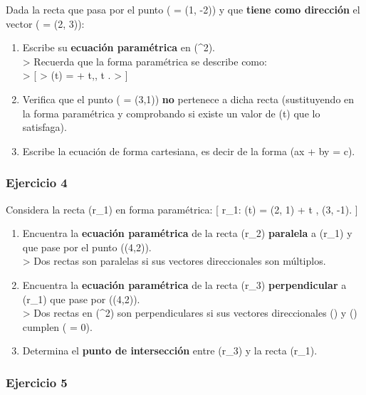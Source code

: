 \documentclass[
  letterpaper,
  DIV=11,
  numbers=noendperiod]{scrartcl}
\begin{document}
Dada la recta que pasa por el punto ( = (1, -2)) y que
\textbf{tiene como dirección} el vector ( = (2, 3)):

\begin{enumerate}
\def\labelenumi{\arabic{enumi}.}
\item
  Escribe su \textbf{ecuación paramétrica} en (\^{}2).\\
  \textgreater{} Recuerda que la forma paramétrica se describe como:\\
  \textgreater{} {[} \textgreater{} (t) =  +
  t,, \quad t \in {}. \textgreater{} {]}
\item
  Verifica que el punto ( = (3,1)) \textbf{no} pertenece a
  dicha recta (sustituyendo en la forma paramétrica y comprobando si
  existe un valor de (t) que lo satisfaga).
\item
  Escribe la ecuación de forma cartesiana, es decir de la forma (ax + by
  = c).
\end{enumerate}

\subsubsection{Ejercicio 4}\label{ejercicio-4}

Considera la recta (r\_1) en forma paramétrica: {[} r\_1:
\quad {}(t) = (2, 1) + t , (3, -1). {]}

\begin{enumerate}
\def\labelenumi{\arabic{enumi}.}
\item
  Encuentra la \textbf{ecuación paramétrica} de la recta (r\_2)
  \textbf{paralela} a (r\_1) y que pase por el punto ((4,2)).\\
  \textgreater{} Dos rectas son paralelas si sus vectores direccionales
  son múltiplos.
\item
  Encuentra la \textbf{ecuación paramétrica} de la recta (r\_3)
  \textbf{perpendicular} a (r\_1) que pase por ((4,2)).\\
  \textgreater{} Dos rectas en (\^{}2) son perpendiculares si
  sus vectores direccionales () y () cumplen
  (\cdot {} = 0).
\item
  Determina el \textbf{punto de intersección} entre (r\_3) y la recta
  (r\_1).
\end{enumerate}

\subsubsection{Ejercicio 5}\label{ejercicio-5}
\end{document}
